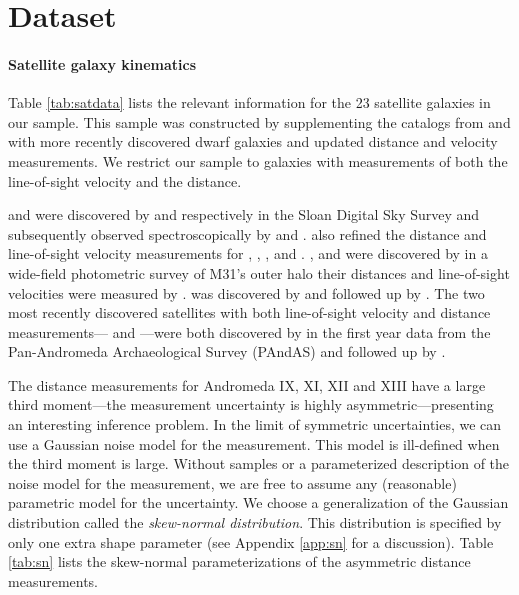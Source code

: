 \documentclass[preprint,12pt]{aastex}
\newcommand{\project}[1]{{\sffamily #1}}
\newcommand{\sdss}{\project{SDSS}}
\newcommand{\pandas}{\project{PAndAS}}
\newcommand{\Tab}[1]{Table \ref{tab:#1}}
\newcommand{\app}[1]{Appendix \ref{app:#1}}
\begin{document}
%
%

\section{Dataset}

\paragraph{Satellite galaxy kinematics}

\Tab{satdata} lists the relevant information for the 23 satellite
galaxies in our sample.  This sample was constructed by supplementing the
catalogs from \citet{Evans:2000a} and \cite{McConnachie:2006} with more
recently discovered dwarf galaxies and updated distance and velocity
measurements. We restrict our sample to galaxies with measurements of both
the line-of-sight velocity and the distance.

 and  were discovered by
\citet{Zucker:2004} and \citet{Zucker:2007} respectively in the Sloan Digital
Sky Survey \citep[\sdss;][]{York:2000} and subsequently observed
spectroscopically by \citet{Collins:2010} and \citet{Kalirai:2010}.
\citet{Kalirai:2010} also refined the distance and line-of-sight velocity
measurements for , ,
,  and .
,  and
 were discovered by \citet{Martin:2006} in a
wide-field photometric survey of M31's outer halo their distances and
line-of-sight velocities were measured by \citet{Collins:2010}.
 was discovered by \citet{Majewski:2007} and
followed up by \citet{Kalirai:2010}.  The two most recently discovered
satellites with both line-of-sight velocity and distance measurements---%
 and ---were
both discovered by \citet{Ibata:2007} in the first year data from the
Pan-Andromeda Archaeological Survey (\pandas) and followed up by
\citet{Letarte:2009}.

The distance measurements for Andromeda IX, XI, XII and XIII have a large
third moment---the measurement uncertainty is highly
asymmetric---presenting an interesting inference problem. In the limit of
symmetric uncertainties, we can use a Gaussian noise model for the
measurement. This model is ill-defined when the third moment is large.
Without samples or a parameterized description of the noise model for the
measurement, we are free to assume any (reasonable) parametric model for
the uncertainty. We choose a generalization of the Gaussian distribution
called the \emph{skew-normal distribution}. This distribution is
specified by only one extra shape parameter (see \app{sn} for a
discussion).  \Tab{sn} lists the skew-normal parameterizations of the
asymmetric distance measurements.
\end{document}
